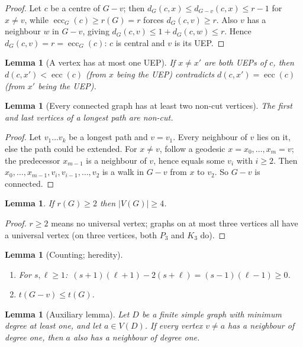 \documentclass[11pt]{article}
\newtheorem{lemma}[theorem]{Lemma}
\theoremstyle{definition}
\newcommand{\ecc}{\operatorname{ecc}}
\begin{document}
\begin{proof}
Let $c$ be a centre of $G-v$; then $d_G(c,x)\le d_{G-v}(c,x)\le r-1$ for
$x\ne v$, while $\ecc_G(c)\ge r(G)=r$ forces $d_G(c,v)\ge r$.  Also $v$ has a
neighbour $w$ in $G-v$, giving $d_G(c,v)\le1+d_G(c,w)\le r$.  Hence
$d_G(c,v)=r=\ecc_G(c)$: $c$ is central and $v$ is its UEP.
\end{proof}

\begin{lemma}[A vertex has at most one UEP]\label{lem:uepunique}
If $x\ne x'$ are both UEPs of $c$, then $d(c,x')<\ecc(c)$ (from $x$ being the
UEP) contradicts $d(c,x')=\ecc(c)$ (from $x'$ being the UEP).
\end{lemma}

\begin{lemma}[Every connected graph has at least two non-cut vertices]
\label{lem:twoncv}
The first and last vertices of a longest path are non-cut.
\end{lemma}

\begin{proof}
Let $v_1\ldots v_k$ be a longest path and $v=v_1$.  Every neighbour of $v$
lies on it, else the path could be extended.  For $x\ne v$, follow a
geodesic $x=x_0,\dots,x_m=v$; the predecessor $x_{m-1}$ is a neighbour of
$v$, hence equals some $v_i$ with $i\ge2$.  Then
$x_0,\dots,x_{m-1},v_i,v_{i-1},\dots,v_2$ is a walk in $G-v$ from $x$ to
$v_2$.  So $G-v$ is connected.
\end{proof}

\begin{lemma}\label{lem:small}
If $r(G)\ge2$ then $|V(G)|\ge4$.
\end{lemma}

\begin{proof}
$r\ge2$ means no universal vertex; graphs on at most three vertices
all have a universal vertex (on three vertices, both $P_3$ and $K_3$ do).
\end{proof}

\begin{lemma}[Counting; heredity]\label{lem:count}
\begin{enumerate}[label=(\roman*)]
\item For $s,\ell\ge1$:\ $(s+1)(\ell+1)-2(s+\ell)=(s-1)(\ell-1)\ge0$.
\item $t(G-v)\le t(G)$.
\end{enumerate}
\end{lemma}

\begin{lemma}[Auxiliary lemma]\label{lem:aux}
Let $D$ be a finite simple graph with minimum degree at least one, and let
$a\in V(D)$.  If every vertex $v\ne a$ has a neighbour of degree one, then
$a$ also has a neighbour of degree one.
\end{lemma}
\end{document}
